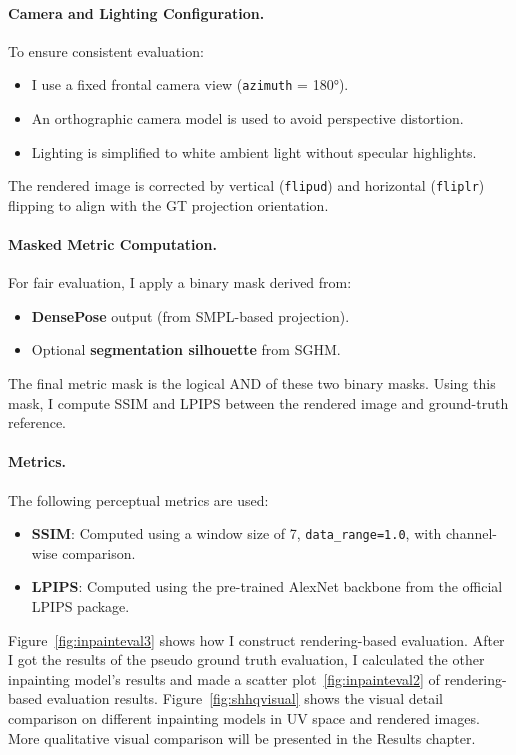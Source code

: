 \paragraph{Camera and Lighting Configuration.}
To ensure consistent evaluation:
\begin{itemize}
  \item I use a fixed frontal camera view (\texttt{azimuth} = 180°).
  \item An orthographic camera model is used to avoid perspective distortion.
  \item Lighting is simplified to white ambient light without specular highlights.
\end{itemize}
The rendered image is corrected by vertical (\texttt{flipud}) and horizontal (\texttt{fliplr}) flipping to align with the GT projection orientation.

\paragraph{Masked Metric Computation.}
For fair evaluation, I apply a binary mask derived from:
\begin{itemize}
  \item \textbf{DensePose} output (from SMPL-based projection).
  \item Optional \textbf{segmentation silhouette} from SGHM.
\end{itemize}

The final metric mask is the logical AND of these two binary masks. Using this mask, I compute SSIM and LPIPS between the rendered image and ground-truth reference.

\paragraph{Metrics.} 
The following perceptual metrics are used:
\begin{itemize}
  \item \textbf{SSIM}: Computed using a window size of 7, \texttt{data\_range=1.0}, with channel-wise comparison.
  \item \textbf{LPIPS}: Computed using the pre-trained AlexNet backbone from the official LPIPS package.
\end{itemize}

 Figure~\ref{fig:inpainteval3} shows how I construct rendering-based evaluation. After I got the results of the pseudo ground truth evaluation, I calculated the other inpainting model's results and made a scatter plot~\ref{fig:inpainteval2} of rendering-based evaluation results. Figure~\ref{fig:shhqvisual} shows the visual detail comparison on different inpainting models in UV space and rendered images. More qualitative visual comparison will be presented in the Results chapter.

